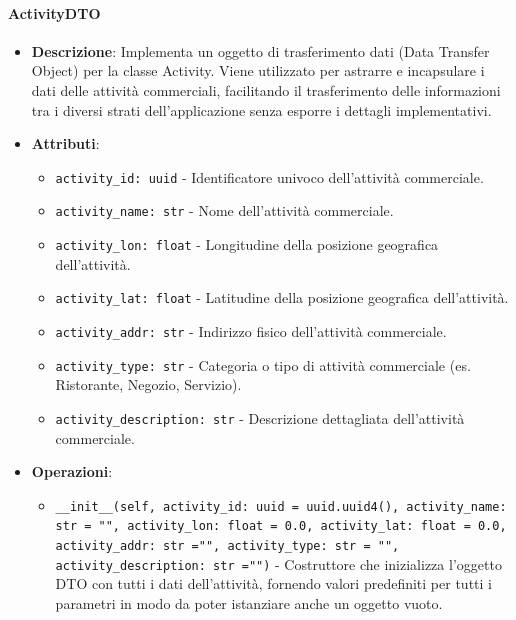 \documentclass[10pt]{article}
\begin{document}
    \paragraph{ActivityDTO}
    \begin{itemize} 
    \item \textbf{Descrizione}: Implementa un oggetto di trasferimento dati (Data Transfer Object) per la classe Activity. Viene utilizzato per astrarre e incapsulare i dati delle attività commerciali, facilitando il trasferimento delle informazioni tra i diversi strati dell'applicazione senza esporre i dettagli implementativi.
    \item \textbf{Attributi}:
    \begin{itemize}
        \item \texttt{activity\_id: uuid} - Identificatore univoco dell'attività commerciale.
        \item \texttt{activity\_name: str} - Nome dell'attività commerciale.
        \item \texttt{activity\_lon: float} - Longitudine della posizione geografica dell'attività.
        \item \texttt{activity\_lat: float} - Latitudine della posizione geografica dell'attività.
        \item \texttt{activity\_addr: str} - Indirizzo fisico dell'attività commerciale.
        \item \texttt{activity\_type: str} - Categoria o tipo di attività commerciale (es. Ristorante, Negozio, Servizio).
        \item \texttt{activity\_description: str} - Descrizione dettagliata dell'attività commerciale.
    \end{itemize}
    
    \item \textbf{Operazioni}:
    \begin{itemize}
        \item \texttt{\_\_init\_\_(self, activity\_id: uuid = uuid.uuid4(), activity\_name: str = "", activity\_lon: float = 0.0, activity\_lat: float = 0.0, activity\_addr: str ="", activity\_type: str = "", activity\_description: str ="")} - Costruttore che inizializza l'oggetto DTO con tutti i dati dell'attività, fornendo valori predefiniti per tutti i parametri in modo da poter istanziare anche un oggetto vuoto.
    \end{itemize}
    \end{itemize}
    
\end{document}
